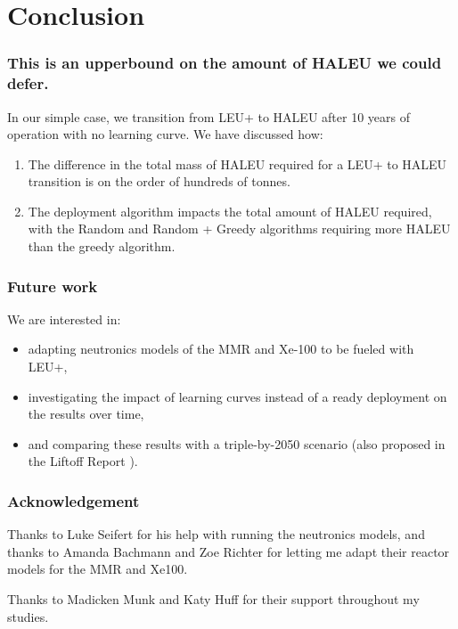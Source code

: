 \documentclass[9pt]{beamer}
\begin{document}
  \section{Conclusion}
  \begin{frame}
      \frametitle{This is an upperbound on the amount of HALEU we could defer.}
      In our simple case, we transition from LEU+ to HALEU after 10 years of operation with no learning curve. We have discussed how:
      \begin{enumerate}
          \item The difference in the total mass of HALEU required for a LEU+ to HALEU transition is on the order of hundreds of tonnes.
          \item The deployment algorithm impacts the total amount of HALEU required, with the Random and Random + Greedy algorithms requiring more HALEU than the greedy algorithm.
      \end{enumerate}
  \end{frame}

  \begin{frame}
    \frametitle{Future work}
    We are interested in:
    \begin{itemize}
      \item adapting neutronics models of the MMR and Xe-100 to be fueled with LEU+,
      \item investigating the impact of learning curves instead of a ready deployment on the results over time,
      \item and comparing these results with a triple-by-2050 scenario (also proposed in the Liftoff Report \cite{julie_liftoff_pathways_2024}).
    \end{itemize}
  \end{frame}


  \begin{frame}
    \frametitle{Acknowledgement}


      Thanks to Luke Seifert for his help with running the neutronics models, and thanks to Amanda Bachmann and Zoe Richter for letting me adapt their reactor models for the MMR and Xe100.

      \vspace{7mm}
      Thanks to Madicken Munk and Katy Huff for their support throughout my studies.
  \end{frame}
\end{document}
